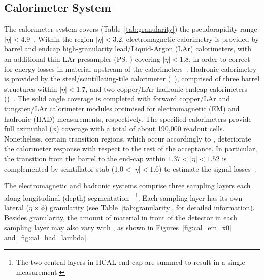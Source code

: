 \subsection{Calorimeter System}\label{ssec:calo}






The calorimeter system covers (Table~\ref{tab:granularity}) the pseudorapidity
range \(|\eta| < 4.9\)~\cite{PERF-2007-01}. Within the region \(|\eta|< 3.2\),
electromagnetic calorimetry is provided by barrel and endcap high-granularity
lead/Liquid-Argon (LAr) calorimeters, with an additional thin LAr presampler
(\ps) covering \(|\eta| < 1.8\), in order to correct for energy losses in
material upstream of the calorimeters~\cite{LARG-2009-01,larg_tdr}. Hadronic
calorimetry is provided by the steel/scintillating-tile calorimeter
(\tilecal~\cite{TCAL-2017-01,tile_tdr}), comprised of three barrel structures
within \(|\eta| < 1.7\), and two copper/LAr hadronic endcap calorimeters
(\hec)~\cite{cal_tdr}.  The solid angle coverage is completed with forward
copper/LAr and tungsten/LAr calorimeter modules optimised for electromagnetic
(EM) and hadronic (HAD) measurements, respectively. The specified calorimeters
provide full azimuthal ($\phi$) coverage with a total of about 190,000 readout
cells.  Nonetheless, certain transition regions, which occur accordingly to
\eta{}, deteriorate the calorimeter response with respect to the rest of the
acceptance.  In particular, the transition from the barrel to the end-cap within
$1.37<|\eta|<1.52$ is complemented by scintillator stab ($1.0<|\eta|<1.6$) to
estimate the signal losses~\cite{cal_tdr}.

The electromagnetic and hadronic systems comprise three sampling layers each along longitudinal (depth) segmentation ~\cite{PERF-2007-01}\footnote{The two
central layers in HCAL end-cap are summed to result in a single measurement.}.
Each sampling layer has its own lateral ($\eta\times\phi$) granularity (see Table~\ref{tab:granularity}, for detailed information). Besides granularity, the amount of material in front of the detector in each sampling layer may also vary with \abseta, as shown in Figures~\ref{fig:cal_em_x0} and~\ref{fig:cal_had_lambda}.


